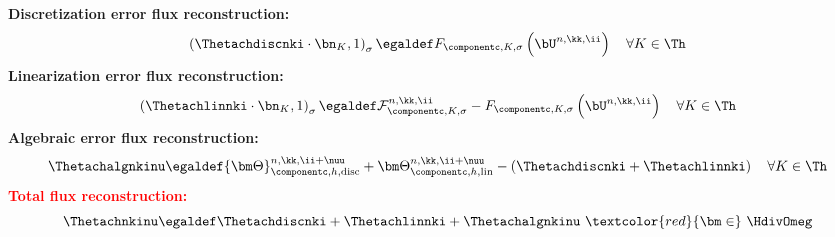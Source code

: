 \documentclass[10 pt]{beamer}
\begin{document}
\begin{frame}
\textcolor{cadmiumgreen}{\textbf{Discretization error flux reconstruction:}}
\begin{equation*}
\left(\Thetachdiscnki \cdot \bn_K,1 \right)_{\sigma} \egaldef F_{\componentc,K,\sigma}\left(\bU^{n,\kk, \ii}\right) \quad \forall K \in \Th
\end{equation*}
\textcolor{cadmiumgreen}{\textbf{Linearization error flux reconstruction:}}
\begin{equation*}
\left(\Thetachlinnki \cdot \bn_K,1 \right)_{\sigma} \egaldef \mathcal{F}_{\componentc,K,\sigma}^{n,\kk,\ii} -  F_{\componentc,K,\sigma}\left(\bU^{n,\kk, \ii}\right) \quad \forall K \in \Th
\end{equation*}
\textcolor{cadmiumgreen}{\textbf{Algebraic error flux reconstruction:}}
\begin{equation*}
\Thetachalgnkinu  \egaldef {\bm \Theta}_{\componentc,h,\mathrm{disc}}^{n,\kk,\ii+\nuu} + {\bm \Theta}_{\componentc,h,\mathrm{lin}}^{n,\kk,\ii+\nuu} - \left(\Thetachdiscnki + \Thetachlinnki \right)
 \quad \forall K \in \Th
\end{equation*}
\textcolor{red}{\textbf{Total flux reconstruction:}} 
\begin{equation*}
\Thetachnkinu \egaldef \Thetachdiscnki+\Thetachlinnki+\Thetachalgnkinu \ \textcolor{red}{\bm \in} \ \HdivOmeg
\end{equation*}
\end{frame}
%
\end{document}
